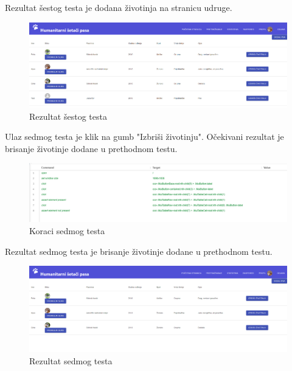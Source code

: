 	\noindent \newline Rezultat šestog testa je dodana životinja na stranicu udruge.

	\begin{figure}[H]
		\includegraphics[width=\linewidth]{slike/front-testovi-12.png}
		\centering
		\caption{Rezultat šestog testa}
		\label{fig:fronttestovi12}
	\end{figure}

	\eject

	\noindent Ulaz sedmog testa je klik na gumb "Izbriši životinju". Očekivani rezultat je brisanje životinje dodane u prethodnom testu.

	\begin{figure}[H]
		\includegraphics[width=\linewidth]{slike/front-testovi-13.png}
		\centering
		\caption{Koraci sedmog testa}
		\label{fig:fronttestovi13}
	\end{figure}

	\noindent \newline Rezultat sedmog testa je brisanje životinje dodane u prethodnom testu.

	\begin{figure}[H]
		\includegraphics[width=\linewidth]{slike/front-testovi-14.png}
		\centering
		\caption{Rezultat sedmog testa}
		\label{fig:fronttestovi14}
	\end{figure}
	
